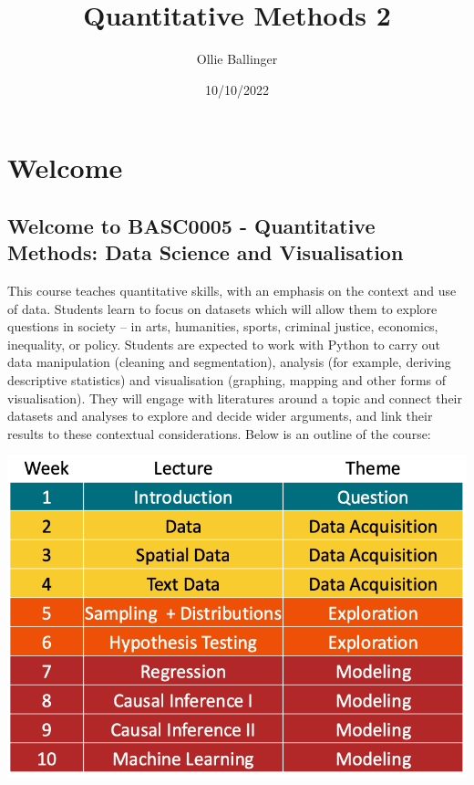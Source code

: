 \documentclass[
  letterpaper,
  DIV=11,
  numbers=noendperiod]{scrreprt}
\title{Quantitative Methods 2}
\author{Ollie Ballinger}
\date{10/10/2022}
\renewcommand*\contentsname{Table of contents}
\newcommand\contentsname{Table of contents}
\begin{document}
\maketitle
\ifdefined\Shaded\renewenvironment{Shaded}{\begin{tcolorbox}[breakable, interior hidden, enhanced, borderline west={3pt}{0pt}{shadecolor}, sharp corners, boxrule=0pt, frame hidden]}{\end{tcolorbox}}\fi

\renewcommand*\contentsname{Table of contents}
{
\hypersetup{linkcolor=}
\setcounter{tocdepth}{2}
\tableofcontents
}

\hypertarget{welcome}{%
\chapter*{Welcome}\label{welcome}}

\hypertarget{welcome-to-basc0005---quantitative-methods-data-science-and-visualisation}{%
\section*{Welcome to BASC0005 - Quantitative Methods: Data Science and
Visualisation}\label{welcome-to-basc0005---quantitative-methods-data-science-and-visualisation}}

This course teaches quantitative skills, with an emphasis on the context
and use of data. Students learn to focus on datasets which will allow
them to explore questions in society -- in arts, humanities, sports,
criminal justice, economics, inequality, or policy. Students are
expected to work with Python to carry out data manipulation (cleaning
and segmentation), analysis (for example, deriving descriptive
statistics) and visualisation (graphing, mapping and other forms of
visualisation). They will engage with literatures around a topic and
connect their datasets and analyses to explore and decide wider
arguments, and link their results to these contextual considerations.
Below is an outline of the course:

\includegraphics{./outline.png}
\end{document}
